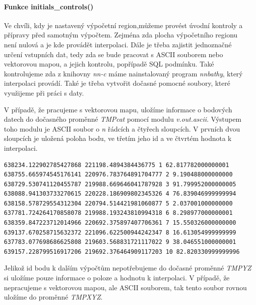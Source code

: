 \documentclass[12pt,a4paper]{article}
\begin{document}
\paragraph{Funkce initials\_controls()}
Ve chvíli, kdy je nastavený výpočetní region,můžeme provést úvodní kontroly a přípravy před samotným výpočtem. Zejména zda plocha výpočetního regionu není nulová a je kde provádět interpolaci. Dále je třeba zajistit jednoznačné určení vstupních dat, tedy zda se bude pracovat s ASCII souborem nebo vektorovou mapou, a jejich kontrolu, popřípadě SQL podmínku. Také kontrolujeme zda z knihovny \textit{nn-c} máme nainstalovaný program \textit{nnbathy}, který interpolaci provádí. Také je třeba vytvořit dočasné pomocné soubory, které využijeme při práci s daty. 

V případě, že pracujeme s vektorovou mapu, uložíme informace o bodových datech do dočasného proměnné \textit{TMPcat} pomocí modulu \textit{v.out.ascii}. Výstupem toho modulu je ASCII soubor o \textit{n} řádcích a čtyřech sloupcích. V prvních dvou sloupcích je uložená poloha bodu, ve třetím jeho id a ve čtvrtém hodnota k interpolaci. 

\begin{lstlisting}
638234.122902785427868 221198.4894384436775 1 62.817782000000001
638755.665974545176141 220976.783764891704777 2 9.190488000000000
638729.530741120455787 219988.669646041787928 3 91.799952000000005
638088.941303733270615 220228.186909802345326 4 76.839046999999994
638158.578729554312304 220794.514421981060877 5 2.037001000000000
637781.724264170858078 219988.193243810994318 6 8.298977000000001
638359.847223712014966 220692.375897407706361 7 15.550326000000000
639137.670258715632372 221096.622500944242347 8 16.613054999999999
637783.077698686625808 219603.568831721117022 9 38.046551000000001
639157.228799516917206 219692.376464909117203 10 82.820330999999996
\end{lstlisting}

Jelikož id bodu k dalším výpočtům nepotřebujeme do dočasné proměnné \textit{TMPYZ} si uložíme pouze informace o poloze a hodnotu k interpolaci. V případě, že nepracujeme s vektorovou mapou, ale ASCII souborem, tak tento soubor rovnou uložíme do proměnné \textit{TMPXYZ}.
\end{document}
